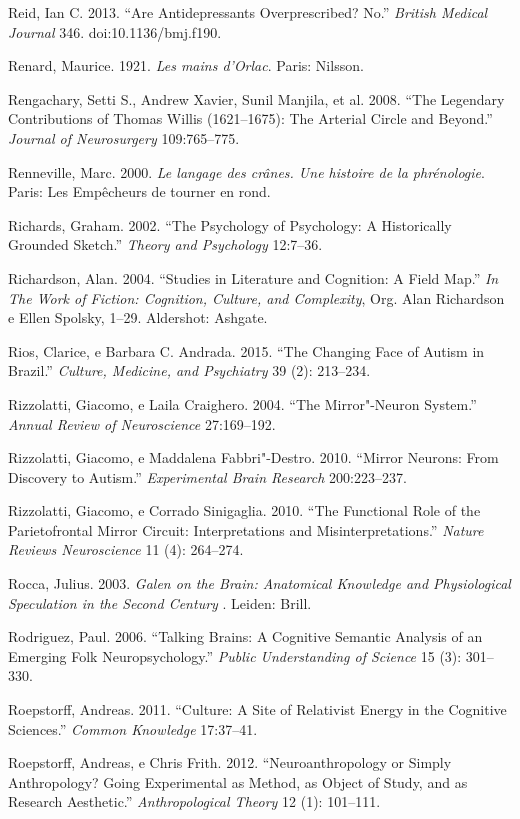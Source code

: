 {\begin{Parskip}
Reid, Ian C. 2013. ``Are Antidepressants Overprescribed? No.''
\emph{British Medical Journal} 346. doi:10.1136/bmj.f190.

Renard, Maurice. 1921. \emph{Les mains d'Orlac}. Paris: Nilsson.

Rengachary, Setti S., Andrew Xavier, Sunil Manjila, et al. 2008. ``The
Legendary Contributions of Thomas Willis (1621--1675): The Arterial
Circle and Beyond.'' \emph{Journal of Neurosurgery} 109:765--775.

Renneville, Marc. 2000. \emph{Le langage des crânes. Une histoire de la
phrénologie}. Paris: Les Empêcheurs de tourner en rond.

Richards, Graham. 2002. ``The Psychology of Psychology: A Historically
Grounded Sketch.'' \emph{Theory and Psychology} 12:7--36.

Richardson, Alan. 2004. ``Studies in Literature and Cognition: A Field
Map.'' \emph{In The Work of Fiction: Cognition, Culture, and
Complexity}, Org. Alan Richardson e Ellen Spolsky, 1--29. Aldershot:
Ashgate.

Rios, Clarice, e Barbara C. Andrada. 2015. ``The Changing Face of Autism
in Brazil.'' \emph{Culture, Medicine, and Psychiatry} 39 (2): 213--234.

Rizzolatti, Giacomo, e Laila Craighero. 2004. ``The Mirror"-Neuron
System.'' \emph{Annual Review of Neuroscience} 27:169--192.

Rizzolatti, Giacomo, e Maddalena Fabbri"-Destro. 2010. ``Mirror Neurons:
From Discovery to Autism.'' \emph{Experimental Brain Research}
200:223--237.

Rizzolatti, Giacomo, e Corrado Sinigaglia. 2010. ``The Functional Role
of the Parietofrontal Mirror Circuit: Interpretations and
Misinterpretations.'' \emph{Nature Reviews Neuroscience} 11 (4):
264--274.

Rocca, Julius. 2003. \emph{Galen on the Brain: Anatomical Knowledge and
Physiological Speculation in the Second Century }. Leiden: Brill.

Rodriguez, Paul. 2006. ``Talking Brains: A Cognitive Semantic Analysis
of an Emerging Folk Neuropsychology.'' \emph{Public Understanding of
Science} 15 (3): 301--330.

Roepstorff, Andreas. 2011. ``Culture: A Site of Relativist Energy in the
Cognitive Sciences.'' \emph{Common Knowledge} 17:37--41.

Roepstorff, Andreas, e Chris Frith. 2012. ``Neuroanthropology or Simply
Anthropology? Going Experimental as Method, as Object of Study, and as
Research Aesthetic.'' \emph{Anthropological Theory} 12 (1): 101--111.


\end{Parskip}}
